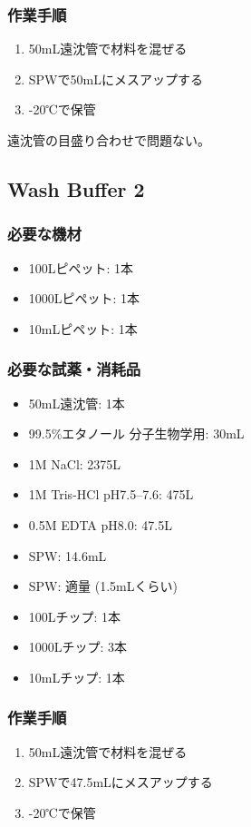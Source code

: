 \documentclass[titlepage,10pt,a4paper,uplatex]{jsbook}
\begin{document}
\subsubsection{作業手順}
\begin{enumerate}
\item 50mL遠沈管で材料を混ぜる
\item SPWで50mLにメスアップする
\item -20℃で保管
\end{enumerate}

遠沈管の目盛り合わせで問題ない。

\subsection{Wash Buffer 2}

\subsubsection{必要な機材}
\begin{itemize}
\item 100{\textmu}Lピペット: 1本
\item 1000{\textmu}Lピペット: 1本
\item 10mLピペット: 1本
\end{itemize}

\subsubsection{必要な試薬・消耗品}
\begin{itemize}
\item 50mL遠沈管: 1本
\item 99.5\%エタノール 分子生物学用: 30mL
\item 1M NaCl: 2375{\textmu}L
\item 1M Tris-HCl pH7.5--7.6: 475{\textmu}L
\item 0.5M EDTA pH8.0: 47.5{\textmu}L
\item SPW: 14.6mL
\item SPW: 適量 (1.5mLくらい)
\item 100{\textmu}Lチップ: 1本
\item 1000{\textmu}Lチップ: 3本
\item 10mLチップ: 1本
\end{itemize}

\subsubsection{作業手順}
\begin{enumerate}
\item 50mL遠沈管で材料を混ぜる
\item SPWで47.5mLにメスアップする
\item -20℃で保管
\end{enumerate}
\end{document}
